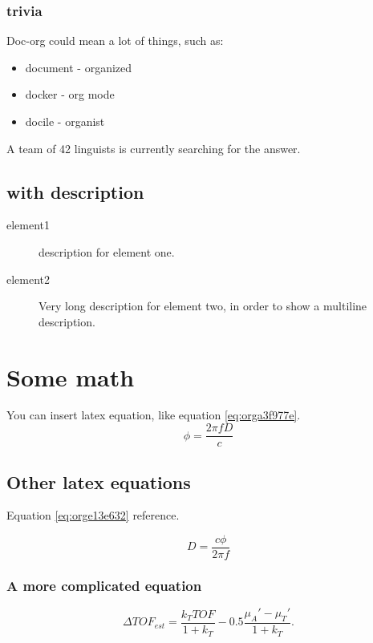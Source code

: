 \documentclass[11pt]{article}
\begin{document}
\subsubsection{trivia}
\label{sec:org3e5ec55}
Doc-org could mean a lot of things, such as:
\begin{itemize}
\item document - organized
\item docker - org mode
\item docile - organist
\end{itemize}
A team of 42 linguists is currently searching for the answer.
\subsection{with description}
\label{sec:org2eed4bb}
\begin{description}
\item[{element1}] description for element one.
\item[{element2}] Very long description for element two, in order to show a
multiline description.
\end{description}

\section{Some math}
\label{sec:org7ce2808}
You can insert latex equation, like equation \ref{eq:orga3f977e}.
\begin{equation}
\label{eq:orga3f977e}
\phi = \frac{2\pi fD}{c}
\end{equation}
\subsection{Other latex equations}
\label{sec:orga1d72ea}
Equation \ref{eq:orge13e632} reference.

\begin{equation}
\label{eq:orge13e632}
D = \frac{c\phi}{2\pi f}
\end{equation}

\subsubsection{A more complicated equation}
\label{sec:org5b12ff6}

\begin{equation}
\Delta TOF_{est} = \frac{k_T TOF}{1+k_T } - 0.5 \frac{\mu_A' - \mu_T'}{1+k_T}.
\end{equation}
\end{document}
